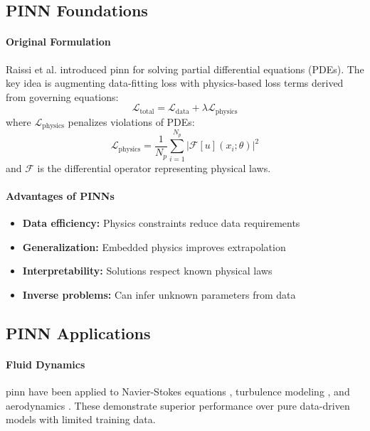 \subsection{PINN Foundations}

\paragraph{Original Formulation}
Raissi et al. \cite{Raissi2019} introduced \acrshort{pinn} for solving partial differential equations (PDEs). The key idea is augmenting data-fitting loss with physics-based loss terms derived from governing equations:
\begin{equation}
\mathcal{L}_{\text{total}} = \mathcal{L}_{\text{data}} + \lambda \mathcal{L}_{\text{physics}}
\end{equation}
where $\mathcal{L}_{\text{physics}}$ penalizes violations of PDEs:
\begin{equation}
\mathcal{L}_{\text{physics}} = \frac{1}{N_p} \sum_{i=1}^{N_p} \left| \mathcal{F}[u](x_i; \theta) \right|^2
\end{equation}
and $\mathcal{F}$ is the differential operator representing physical laws.

\paragraph{Advantages of PINNs}
\begin{itemize}
    \item \textbf{Data efficiency:} Physics constraints reduce data requirements
    \item \textbf{Generalization:} Embedded physics improves extrapolation
    \item \textbf{Interpretability:} Solutions respect known physical laws
    \item \textbf{Inverse problems:} Can infer unknown parameters from data
\end{itemize}

\subsection{PINN Applications}

\paragraph{Fluid Dynamics}
\acrshort{pinn} have been applied to Navier-Stokes equations \cite{Raissi2020}, turbulence modeling \cite{Wang2020pinn}, and aerodynamics \cite{Mao2020}. These demonstrate superior performance over pure data-driven models with limited training data.

